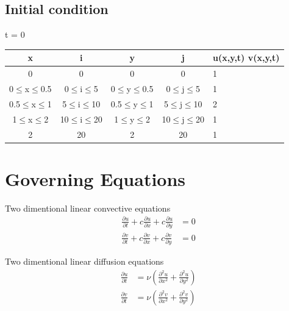 \documentclass[conf]{new-aiaa}
\begin{document}
\subsection{Initial condition}
\par t = 0\\
\begin{center}
	\begin{tabular}{c | c | c | c | m{2em}}
		x & i & y & j & u(x,y,t) v(x,y,t) \\
		\hline
		0 & 0 & 0 & 0 & 1 \\
		\hline
		0$\le$x$\leq$0.5 & 0$\le$i$\leq$5 & 0$\le$y$\leq$0.5 & 0$\le$j$\leq$5 & 1\\
		\hline
		0.5$\le$x$\leq$1 & 5$\le$i$\leq$10 & 0.5$\le$y$\leq$1 & 5$\le$j$\leq$10 & 2\\
		\hline
		1$\le$x$\leq$2 & 10$\le$i$\leq$20 & 1$\le$y$\leq$2 & 10$\le$j$\leq$20 & 1\\
		\hline
		2 & 20 & 2 & 20 & 1 \\
	\end{tabular}
\end{center}


\section{Governing Equations}
\par Two dimentional linear convective equations\\
\begin{align}
	\frac{\partial u}{\partial t}+c \frac{\partial u}{\partial x} +c \frac{\partial u}{\partial y} & = 0 \label{linear_conv_01} \\
	\frac{\partial v}{\partial t}+c \frac{\partial v}{\partial x} +c \frac{\partial v}{\partial y} & = 0 \label{linear_conv_02}
\end{align}
\par Two dimentional linear diffusion equations\\
\begin{align}
	\frac{\partial u}{\partial t} & = \nu \left(\frac{\partial^2 u}{\partial x^2} + \frac{\partial^2 u}{\partial y^2} \right) \label{linear_diff_01} \\
	\frac{\partial v}{\partial t} & = \nu \left(\frac{\partial^2 v}{\partial x^2} + \frac{\partial^2 v}{\partial y^2} \right) \label{linear_diff_02}
\end{align}
\end{document}
